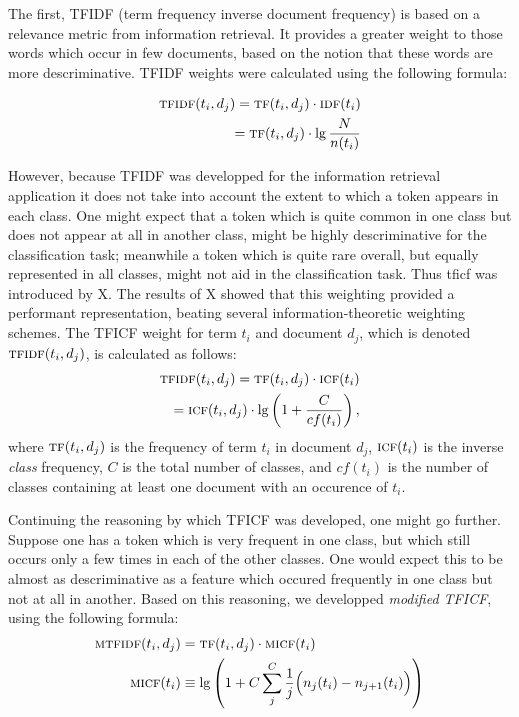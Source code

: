 \documentclass[conference,letterpaper]{IEEEtran}
\begin{document}
The first, TFIDF (term frequency inverse document frequency) is based 
on a relevance metric from information retrieval.  It provides a greater 
weight to those words which occur in 
few documents, based on the notion that these words are more descriminative.
TFIDF weights were calculated using the following formula:

\begin{align}
	\textsc{tfidf}(t_i, d_j) = \textsc{tf}(t_i, d_j) \cdot \textsc{idf}(t_i) \\
	= \textsc{tf}(t_i, d_j) \cdot \lg \frac{N}{n(t_i)}
\end{align}

However, because TFIDF was developped for the information retrieval application
it does not take into account the extent to which a token appears in 
each class.  One might expect that a token which is quite common in one class
but does not appear at all in another class, might be highly descriminative
for the classification task; meanwhile a token which is quite rare overall, 
but equally represented in all classes, might not aid in the classification
task.  Thus tficf was introduced by X.  The results of X showed that 
this weighting provided a performant representation, beating several 
information-theoretic weighting schemes.  The TFICF weight for term $t_i$ and
document $d_j$, which is denoted $\textsc{tfidf}(t_i, d_j)$, is calculated 
as follows:
\begin{align}
	\textsc{tfidf}(t_i, d_j) = \textsc{tf}(t_i, d_j) \cdot \textsc{icf}(t_i) \\
	= \textsc{icf}(t_i, d_j) \cdot \lg \left(1 + \frac{C}{cf(t_i)}\right),
\end{align}
where $\textsc{tf}(t_i, d_j)$ is the frequency of term $t_i$ in document $d_j$,
$\textsc{icf}(t_i)$ is the inverse \textit{class} frequency, $C$ is the 
total number of classes, and $cf(t_i)$ is the number of classes containing at
least one document with an occurence of $t_i$.


Continuing the reasoning by which TFICF was developed, one might go further.
Suppose one has a token which is very frequent in one class, but which still
occurs only a few times in each of the other classes.  One would expect this
to be almost as descriminative as a feature which occured frequently in one
class but not at all in another.  Based on this reasoning, we developped
\textit{modified TFICF}, using the following formula:
\begin{align}
	\textsc{mtfidf}(t_i, d_j) 
		&= \textsc{tf}(t_i, d_j) \cdot \textsc{micf}(t_i) \\
	\textsc{micf}(t_i)
		&\equiv \lg \left(1 
			+ C\sum_j^C \frac{1}{j}\Big(n_{j}(t_i) - n_{j+1}(t_i)\Big) \right)
\end{align}
\end{document}
